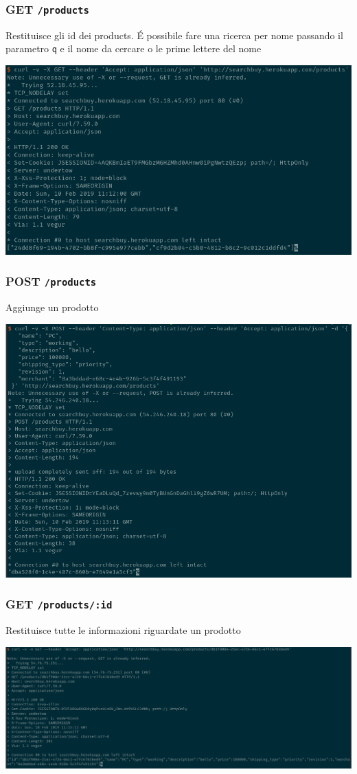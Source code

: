 \documentclass[11pt]{article}
\begin{document}
\subsubsection{GET \texttt{/products}}
\label{sec:org0661651}
Restituisce gli id dei products.  
É possibile fare una ricerca per nome passando il parametro \texttt{q} e il nome da cercare o le prime lettere del nome
\begin{center}
\includegraphics[width=.9\linewidth]{img/products-screen/get-products.png}
\end{center}
\subsubsection{POST \texttt{/products}}
\label{sec:org3a47fa1}
Aggiunge un prodotto
\begin{center}
\includegraphics[width=.9\linewidth]{img/products-screen/post-products.png}
\end{center}
\subsubsection{GET \texttt{/products/:id}}
\label{sec:org99672ec}
Restituisce tutte le informazioni riguardate un prodotto
\begin{center}
\includegraphics[width=.9\linewidth]{img/products-screen/get-product.png}
\end{center}
\end{document}
